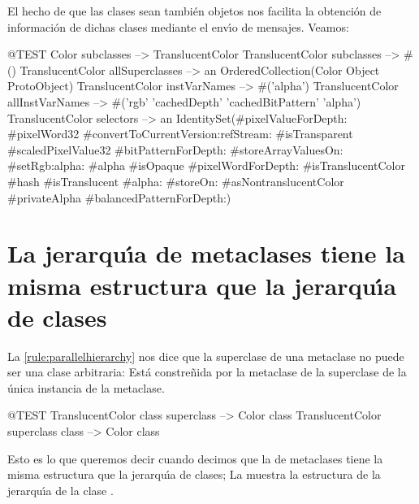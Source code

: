 \documentclass[a4paper,10pt,twoside]{book}
\begin{document}
El hecho de que las clases sean también objetos nos facilita la obtención de informaci\'on de dichas clases mediante el env\'{\i}o de mensajes. Veamos:

\begin{code}{@TEST}
Color subclasses                           --> {TranslucentColor}
TranslucentColor subclasses         --> #()
TranslucentColor allSuperclasses  --> an OrderedCollection(Color Object ProtoObject)
TranslucentColor instVarNames     --> #('alpha')
TranslucentColor allInstVarNames --> #('rgb' 'cachedDepth' 'cachedBitPattern' 'alpha')
TranslucentColor selectors             -->  an IdentitySet(#pixelValueForDepth: #pixelWord32 #convertToCurrentVersion:refStream: #isTransparent #scaledPixelValue32 #bitPatternForDepth: #storeArrayValuesOn: #setRgb:alpha: #alpha #isOpaque #pixelWordForDepth: #isTranslucentColor #hash #isTranslucent #alpha: #storeOn: #asNontranslucentColor #privateAlpha #balancedPatternForDepth:)
\end{code}

\section{La jerarqu\'{\i}a de metaclases tiene la misma estructura que la jerarqu\'{\i}a de clases}

La \ref{rule:parallelhierarchy} nos dice que la superclase de una metaclase no puede ser una clase arbitraria: Est\'a constre\~nida por la metaclase de la superclase de la \'unica instancia de la metaclase.

\begin{code}{@TEST}
TranslucentColor class superclass --> Color class
TranslucentColor superclass class --> Color class
\end{code}

\noindent
Esto es lo que queremos decir cuando decimos que la  de metaclases tiene la misma estructura que la jerarqu\'{\i}a de clases; La  muestra la estructura de la jerarqu\'{\i}a de la clase .
\end{document}
